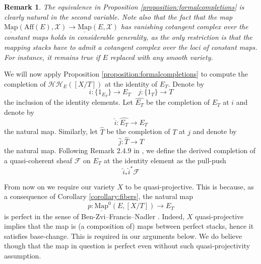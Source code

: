 \documentclass[11pt,letterpaper]{amsart}
\newtheorem{remark}[dummy]{Remark}
\newcommand{\cF}{\mathcal{F}}
\newcommand{\cX}{\mathcal{X}}
\newcommand{\cHH}{\mathcal{HH}}
\newcommand{\Map}[2]{\underline{\mathrm{Map}}\left (#1,#2\right )}
\newcommand{\Mapo}[2]{\underline{\mathrm{Map}}^{0}\left (#1,#2\right )}
\newcommand{\Aff}[1]{\mathrm{Aff}(#1)}
\begin{document}

\begin{remark}
The equivalence in Proposition \ref{proposition:formalcompletions} is clearly natural in the second variable. Note also that the fact that the map $\Map{\Aff{E}}{\cX}\rightarrow\Map{E}{\cX}$ has vanishing cotangent complex over the constant maps holds in considerable generality, as the only restriction is that the mapping stacks have to admit a cotangent complex over the loci of constant maps. For instance, it remains true if $E$ replaced with any smooth variety.
\end{remark}

We will now apply Proposition \ref{proposition:formalcompletions} to compute the completion of $\cHH_E([X/T])$ at the identity of $E_T$. 
Denote by 
$$
i: \{1_{E_T}\} \to E_T \quad j: \{1_T\} \to T
$$
the inclusion of the identity elements.  
Let $\widehat{E_T}$ be the completion of $E_T$ at $i$ and denote by 
$$\widehat{i}: \widehat{E_T}\rightarrow E_T$$ the natural map. %
Similarly, let $\widehat{T}$ be the completion of $T$ at $j$ and denote by $$\widehat{j}:\widehat{T}\rightarrow T$$ the natural map. 
Following Remark $2.4.9$ in \cite{HChen}, we define the derived completion of a quasi-coherent sheaf $\cF$ on $E_T$ at the identity element as the pull-push $$\widehat{i}_\ast\widehat{i}^\ast \cF$$

From now on we require our variety $X$ to be quasi-projective. This is because, as a consequence of Corollary \ref{corollary:fibers}, the natural map 
$$p:\Mapo{E}{[X/T]}\to E_T$$
is perfect in the sense of Ben-Zvi--Francis--Nadler \cite{BZFN}. Indeed, $X$ quasi-projective implies that the map is (a composition of) maps between perfect stacks, hence it satisfies base-change. This is required in our arguments below. We do believe though that the map in question is perfect even without such quasi-projectivity assumption. 
\end{document}
